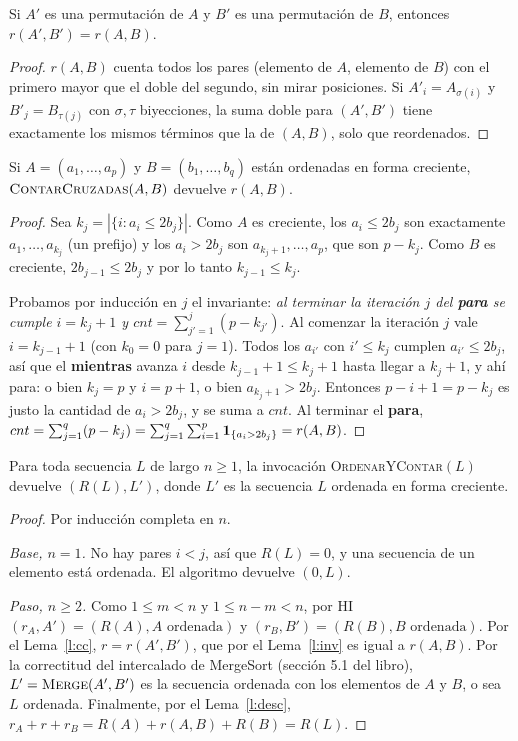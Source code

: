 \begin{lema}[Invariancia de $r$]\label{l:inv}
Si $A'$ es una permutación de $A$ y $B'$ es una permutación de $B$, entonces
$r(A',B')=r(A,B)$.
\end{lema}
\begin{proof}
$r(A,B)$ cuenta todos los pares (elemento de $A$, elemento de $B$) con el primero mayor
que el doble del segundo, sin mirar posiciones. Si $A'_i=A_{\sigma(i)}$ y
$B'_j=B_{\tau(j)}$ con $\sigma,\tau$ biyecciones, la suma doble para $(A',B')$ tiene
exactamente los mismos términos que la de $(A,B)$, solo que reordenados.
\end{proof}

\begin{lema}\label{l:cc}
Si $A=(a_1,\dots,a_p)$ y $B=(b_1,\dots,b_q)$ están ordenadas en forma creciente,
$\textsc{ContarCruzadas}(A,B)$ devuelve $r(A,B)$.
\end{lema}
\begin{proof}
Sea $k_j=|\{i: a_i\le 2b_j\}|$. Como $A$ es creciente, los $a_i\le 2b_j$ son exactamente
$a_1,\dots,a_{k_j}$ (un prefijo) y los $a_i>2b_j$ son $a_{k_j+1},\dots,a_p$, que son
$p-k_j$. Como $B$ es creciente, $2b_{j-1}\le 2b_j$ y por lo tanto
$k_{j-1}\le k_j$.

Probamos por inducción en $j$ el invariante: \emph{al terminar la iteración $j$ del
\textbf{para} se cumple $i=k_j+1$ y $cnt=\sum_{j'=1}^{j}(p-k_{j'})$}. Al comenzar la
iteración $j$ vale $i=k_{j-1}+1$ (con $k_0=0$ para $j=1$). Todos los $a_{i'}$ con
$i'\le k_j$ cumplen $a_{i'}\le 2b_j$, así que el \textbf{mientras} avanza $i$ desde
$k_{j-1}+1\le k_j+1$ hasta llegar a $k_j+1$, y ahí para: o bien $k_j=p$ y $i=p+1$, o bien
$a_{k_j+1}>2b_j$. Entonces $p-i+1=p-k_j$ es justo la cantidad de $a_i>2b_j$, y se suma a
$cnt$. Al terminar el \textbf{para},
$cnt=\sum_{j=1}^q(p-k_j)=\sum_{j=1}^q\sum_{i=1}^p\mathbf{1}_{\{a_i>2b_j\}}=r(A,B)$.
\end{proof}

\begin{proposicion}
Para toda secuencia $L$ de largo $n\ge1$, la invocación \textsc{OrdenarYContar}$(L)$
devuelve $(R(L),L')$, donde $L'$ es la secuencia $L$ ordenada en forma creciente.
\end{proposicion}
\begin{proof}
Por inducción completa en $n$.

\emph{Base, $n=1$.} No hay pares $i<j$, así que $R(L)=0$, y una secuencia de un elemento
está ordenada. El algoritmo devuelve $(0,L)$.

\emph{Paso, $n\ge 2$.} Como $1\le m<n$ y $1\le n-m<n$, por HI
$(r_A,A')=(R(A),\text{$A$ ordenada})$ y $(r_B,B')=(R(B),\text{$B$ ordenada})$. Por el
Lema~\ref{l:cc}, $r=r(A',B')$, que por el Lema~\ref{l:inv} es igual a $r(A,B)$. Por la
correctitud del intercalado de MergeSort (sección 5.1 del libro), $L'=\textsc{Merge}(A',B')$
es la secuencia ordenada con los elementos de $A$ y $B$, o sea $L$ ordenada. Finalmente,
por el Lema~\ref{l:desc}, $r_A+r+r_B=R(A)+r(A,B)+R(B)=R(L)$.
\end{proof}

